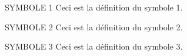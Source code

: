 
\listesymboles
\begin{liste}
\item[SYMBOLE 1] Ceci est la définition du symbole 1.

\item[SYMBOLE 2] Ceci est la définition du symbole 2.

\item[SYMBOLE 3] Ceci est la définition du symbole 3.
\end{liste}


\cleardoublepage

